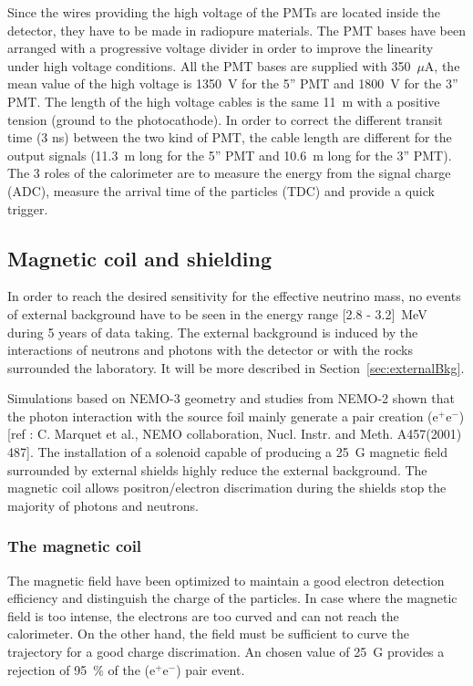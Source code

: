 \documentclass[main.tex]{subfiles}
\begin{document}
\NI Since the wires providing the high voltage of the PMTs are located inside the detector, they have to be made in radiopure materials. The PMT bases have been arranged with a progressive voltage divider in order to improve the linearity under high voltage conditions. All the PMT bases are supplied with 350~$\mu$A, the mean value of the high voltage is 1350~V for the 5'' PMT and 1800~V for the 3'' PMT. The length of the high voltage cables is the same 11~m with a positive tension (ground to the photocathode). In order to correct the different transit time (3 ns) between the two kind of PMT, the cable length are different for the output signals (11.3~m long for the 5'' PMT and 10.6~m long for the 3'' PMT). The 3 roles of the calorimeter are to measure the energy from the signal charge (ADC), measure the arrival time of the particles (TDC) and provide a quick trigger.


\FloatBarrier


\subsection{Magnetic coil and shielding}


\NI In order to reach the desired sensitivity for the effective neutrino mass, no events of external background have to be seen in the energy range [2.8 - 3.2]~MeV during 5 years of data taking. The external background is induced by the interactions of neutrons and photons with the detector or with the rocks surrounded the laboratory. It will be more described in Section~\ref{sec:externalBkg}. 


\bigskip


\NI Simulations based on NEMO-3 geometry and studies from NEMO-2 shown that the photon interaction with the source foil mainly generate a pair creation (e$^+$e$^-$) [ref : C. Marquet et al., NEMO collaboration, Nucl. Instr. and Meth. A457(2001) 487]. The installation of a solenoid capable of producing a 25~G magnetic field surrounded by external shields highly reduce the external background. The magnetic coil allows positron/electron discrimation during the shields stop the majority of photons and neutrons.  


\subsubsection{The magnetic coil}


\NI The magnetic field have been optimized to maintain a good electron detection efficiency and distinguish the charge of the particles. In case where the magnetic field is too intense, the electrons are too curved and can not reach the calorimeter. On the other hand, the field must be sufficient to curve the trajectory for a good charge discrimation. An chosen value of 25~G provides a rejection of 95~\% of the (e$^+$e$^-$) pair event.
\end{document}

